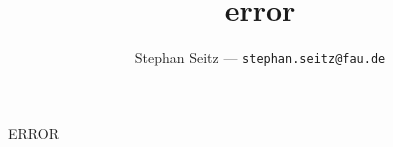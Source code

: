 \documentclass[aspectratio=43]{beamer}
\title{
	error
}
\author{
	Stephan Seitz --- \texttt{stephan.seitz@fau.de}
}
\begin{document}
\begin{frame}[c]{}
   \Huge
   \begin{center}
      ERROR
   \end{center}

\end{frame}
\end{document}
